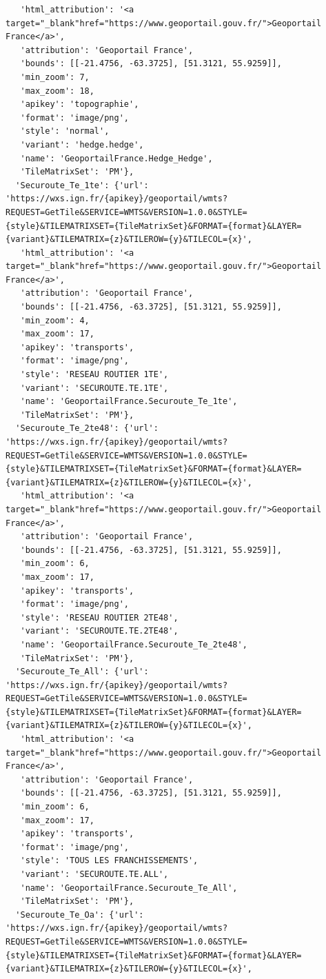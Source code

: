 \documentclass[
  letterpaper,
  DIV=11,
  numbers=noendperiod]{scrreprt}
\begin{document}
\begin{verbatim}
   'html_attribution': '<a target="_blank"href="https://www.geoportail.gouv.fr/">Geoportail France</a>',
   'attribution': 'Geoportail France',
   'bounds': [[-21.4756, -63.3725], [51.3121, 55.9259]],
   'min_zoom': 7,
   'max_zoom': 18,
   'apikey': 'topographie',
   'format': 'image/png',
   'style': 'normal',
   'variant': 'hedge.hedge',
   'name': 'GeoportailFrance.Hedge_Hedge',
   'TileMatrixSet': 'PM'},
  'Securoute_Te_1te': {'url': 'https://wxs.ign.fr/{apikey}/geoportail/wmts?REQUEST=GetTile&SERVICE=WMTS&VERSION=1.0.0&STYLE={style}&TILEMATRIXSET={TileMatrixSet}&FORMAT={format}&LAYER={variant}&TILEMATRIX={z}&TILEROW={y}&TILECOL={x}',
   'html_attribution': '<a target="_blank"href="https://www.geoportail.gouv.fr/">Geoportail France</a>',
   'attribution': 'Geoportail France',
   'bounds': [[-21.4756, -63.3725], [51.3121, 55.9259]],
   'min_zoom': 4,
   'max_zoom': 17,
   'apikey': 'transports',
   'format': 'image/png',
   'style': 'RESEAU ROUTIER 1TE',
   'variant': 'SECUROUTE.TE.1TE',
   'name': 'GeoportailFrance.Securoute_Te_1te',
   'TileMatrixSet': 'PM'},
  'Securoute_Te_2te48': {'url': 'https://wxs.ign.fr/{apikey}/geoportail/wmts?REQUEST=GetTile&SERVICE=WMTS&VERSION=1.0.0&STYLE={style}&TILEMATRIXSET={TileMatrixSet}&FORMAT={format}&LAYER={variant}&TILEMATRIX={z}&TILEROW={y}&TILECOL={x}',
   'html_attribution': '<a target="_blank"href="https://www.geoportail.gouv.fr/">Geoportail France</a>',
   'attribution': 'Geoportail France',
   'bounds': [[-21.4756, -63.3725], [51.3121, 55.9259]],
   'min_zoom': 6,
   'max_zoom': 17,
   'apikey': 'transports',
   'format': 'image/png',
   'style': 'RESEAU ROUTIER 2TE48',
   'variant': 'SECUROUTE.TE.2TE48',
   'name': 'GeoportailFrance.Securoute_Te_2te48',
   'TileMatrixSet': 'PM'},
  'Securoute_Te_All': {'url': 'https://wxs.ign.fr/{apikey}/geoportail/wmts?REQUEST=GetTile&SERVICE=WMTS&VERSION=1.0.0&STYLE={style}&TILEMATRIXSET={TileMatrixSet}&FORMAT={format}&LAYER={variant}&TILEMATRIX={z}&TILEROW={y}&TILECOL={x}',
   'html_attribution': '<a target="_blank"href="https://www.geoportail.gouv.fr/">Geoportail France</a>',
   'attribution': 'Geoportail France',
   'bounds': [[-21.4756, -63.3725], [51.3121, 55.9259]],
   'min_zoom': 6,
   'max_zoom': 17,
   'apikey': 'transports',
   'format': 'image/png',
   'style': 'TOUS LES FRANCHISSEMENTS',
   'variant': 'SECUROUTE.TE.ALL',
   'name': 'GeoportailFrance.Securoute_Te_All',
   'TileMatrixSet': 'PM'},
  'Securoute_Te_Oa': {'url': 'https://wxs.ign.fr/{apikey}/geoportail/wmts?REQUEST=GetTile&SERVICE=WMTS&VERSION=1.0.0&STYLE={style}&TILEMATRIXSET={TileMatrixSet}&FORMAT={format}&LAYER={variant}&TILEMATRIX={z}&TILEROW={y}&TILECOL={x}',

\end{verbatim}
\end{document}
